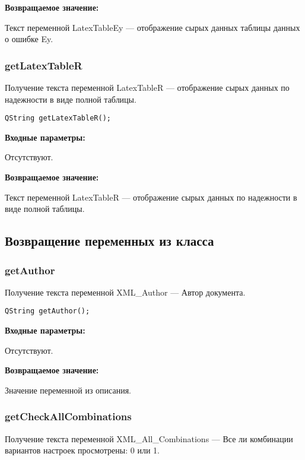 \documentclass[a4paper,12pt]{article}
\begin{document}
\textbf{Возвращаемое значение:}

Текст переменной LatexTableEy --- отображение сырых данных таблицы данных о ошибке Ey.


\subsubsection{getLatexTableR}\label{getLatexTableR}

Получение текста переменной LatexTableR --- отображение сырых данных по надежности в виде полной таблицы.


\begin{lstlisting}[label=code_syntax_getLatexTableR,caption=Синтаксис]
QString getLatexTableR();
\end{lstlisting}

\textbf{Входные параметры:}

Отсутствуют.

\textbf{Возвращаемое значение:}

Текст переменной LatexTableR --- отображение сырых данных по надежности в виде полной таблицы.


\subsection{Возвращение переменных из класса}

\subsubsection{getAuthor}\label{getAuthor}

Получение текста переменной XML\_Author --- Автор документа.


\begin{lstlisting}[label=code_syntax_getAuthor,caption=Синтаксис]
QString getAuthor();
\end{lstlisting}

\textbf{Входные параметры:}

Отсутствуют.

\textbf{Возвращаемое значение:}

Значение переменной из описания.


\subsubsection{getCheckAllCombinations}\label{getCheckAllCombinations}

Получение текста переменной  XML\_All\_Combinations --- Все ли комбинации вариантов настроек просмотрены: 0 или 1.
\end{document}
